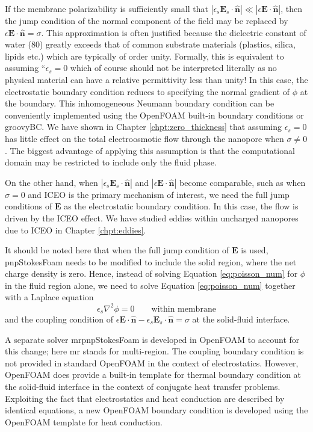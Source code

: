 If the membrane polarizability is sufficiently small that $|\epsilon_{s} \mathbf{E}_{s} \cdot \hat{\mathbf{n}}|\ll|\epsilon \mathbf{E} \cdot  \hat{\mathbf{n}}|$, then the jump condition of the normal component of the field may be replaced by $\epsilon \mathbf{E} \cdot \hat{\mathbf{n}} = \sigma$. This approximation is often justified because the dielectric constant of water ($80$) greatly exceeds that of common substrate materials (plastics, silica, lipids etc.) which are typically of order unity. Formally, this is equivalent to assuming ``$\epsilon_s = 0$ which of course should not be interpreted literally as no physical material can have a relative permittivity less than unity! In this case, the electrostatic boundary condition reduces to specifying the normal gradient of $\phi$ at the boundary. This inhomogeneous Neumann boundary condition can be conveniently implemented using the OpenFOAM built-in boundary conditions or \textsf{groovyBC}. We have shown in Chapter \ref{chpt:zero_thickness} that assuming $\epsilon_s=0$ has little effect on the total electroosmotic flow through the nanopore when $\sigma \neq 0$. The biggest advantage of applying this assumption is that the computational domain may be restricted to include only the fluid phase.

On the other hand, when $|\epsilon_{s} \mathbf{E}_{s} \cdot \hat{\mathbf{n}}|$ and 
$|\epsilon \mathbf{E} \cdot  \hat{\mathbf{n}}|$ become comparable, such as when $\sigma = 0$ and ICEO is the primary mechanism of interest, we need the full jump conditions of $\mathbf{E}$ as the electrostatic boundary condition. In this case, the flow is driven by the ICEO effect. We have studied eddies within uncharged nanopores due to ICEO in Chapter \ref{chpt:eddies}. 

It should be noted here that when the full jump condition of $\mathbf{E}$ is used, \textsf{pnpStokesFoam} needs to be modified to include the solid region, where the net charge density is zero. Hence, instead of solving Equation \ref{eq:poisson_num} for $\phi$ in the fluid region alone, we need to solve Equation \ref{eq:poisson_num} together with a Laplace equation
\begin{equation}
\epsilon_s \nabla^2 \phi = 0 \qquad \mbox{within membrane}
\label{eq:laplace_num}
\end{equation}
and the coupling condition of $\epsilon \mathbf{E} \cdot  \hat{\mathbf{n}} - \epsilon_{s} \mathbf{E}_{s} \cdot \hat{\mathbf{n}} = \sigma$ at the solid-fluid interface. 

A separate solver \textsf{mrpnpStokesFoam} is developed in OpenFOAM to account for this change; here \textsf{mr} stands for multi-region. The coupling boundary condition is not provided in standard OpenFOAM in the context of electrostatics. However, OpenFOAM does provide a built-in template for thermal boundary condition at the solid-fluid interface in the context of conjugate heat transfer problems. Exploiting the fact that electrostatics and heat conduction are described by identical equations, a new OpenFOAM boundary condition is developed using the OpenFOAM template for heat conduction.


